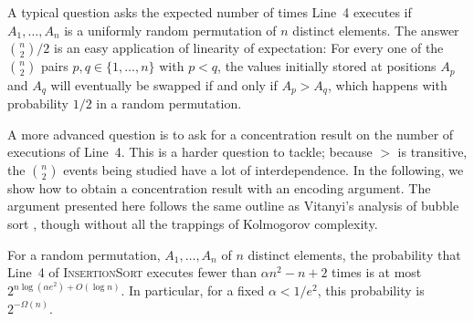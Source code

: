 \documentclass{patmorin}
\begin{document}
A typical question asks the expected number of times Line~4 executes
if $A_1,\ldots,A_n$ is a uniformly random permutation of $n$ distinct
elements.  The answer $\binom{n}{2}/2$ is an easy application of
linearity of expectation: For every one of the $\binom{n}{2}$ pairs
$p,q\in\{1,\ldots,n\}$ with $p<q$, the values initially stored at
positions $A_p$ and $A_q$ will eventually be swapped if and only if $A_p >
A_q$, which happens with probability $1/2$ in a random permutation.

A more advanced question is to ask for a concentration result on the
number of executions of Line~4. This is a harder question to tackle;
because $>$ is transitive, the $\binom{n}{2}$ events being studied have
a lot of interdependence. In the following, we show how to obtain a
concentration result with an encoding argument.  The argument presented
here follows the same outline as Vitanyi's analysis of bubble sort
\cite{vitanyi:analysis}, though without all the trappings of Kolmogorov complexity.

\begin{thm}
  For a random permutation, $A_1,\ldots,A_n$ of $n$ distinct elements,
  the probability that Line~4 of \textsc{InsertionSort} executes fewer
  than $\alpha n^2 - n + 2$ times is at most $2^{n\log(\alpha e^2)+O(\log
  n)}$.  In particular, for a fixed $\alpha < 1/e^2$, this probability
  is $2^{-\Omega(n)}$.
\end{thm}
\end{document}
